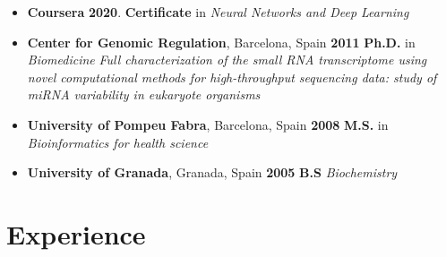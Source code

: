 \begin{itemize}
\tightlist
\item \textbf{Coursera} \hfill \textbf{2020}.
  \newline
  \textbf{Certificate} in \textit{Neural Networks and Deep Learning}
\item
  \textbf{Center for Genomic Regulation}, Barcelona, Spain \hfill \textbf{2011}
  \newline
  \textbf{Ph.D.} in \textit{Biomedicine}
  \newline
  \textit{Full characterization of the small RNA transcriptome using novel computational methods for high-throughput
sequencing data: study of  miRNA variability in eukaryote organisms}
\item
  \textbf{University of Pompeu Fabra}, Barcelona, Spain \hfill \textbf{2008}
  \newline
  \textbf{M.S.} in \textit{Bioinformatics for health science}
\item
  \textbf{University of Granada}, Granada, Spain \hfill \textbf{2005}
  \newline
  \textbf{B.S} \textit{Biochemistry}
\end{itemize}

\hypertarget{experience}{%
\section{Experience}\label{experience}}

